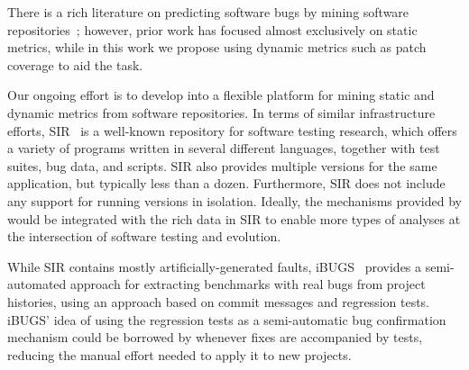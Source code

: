 There is a rich literature on predicting software bugs by mining
software repositories~\cite{bug-feature:icse13,genealogies:issre13};
however, prior work has focused almost exclusively on static metrics,
while in this work we propose using dynamic metrics such as patch
coverage to aid the task.

Our ongoing effort is to develop \covrig into a flexible platform for
mining static and dynamic metrics from software repositories.  In
terms of similar infrastructure efforts, SIR~\cite{sir:2005} is a
well-known repository for software testing research, which offers a
variety of programs written in several different languages, together
with test suites, bug data, and scripts.  SIR also provides multiple
versions for the same application, but typically less than a dozen.
Furthermore, SIR does not include any support for running versions in
isolation.  Ideally, the mechanisms provided by \covrig would be
integrated with the rich data in SIR to enable more types of analyses
at the intersection of software testing and evolution.


While SIR contains mostly artificially-generated faults,
iBUGS~\cite{ibugs} provides a semi-automated approach for extracting
benchmarks with real bugs from project histories, using an approach
based on commit messages and regression tests. iBUGS' idea of using
the regression tests as a semi-automatic bug confirmation mechanism
could be borrowed by \covrig whenever fixes are accompanied by tests,
reducing the manual effort needed to apply it to new projects.






